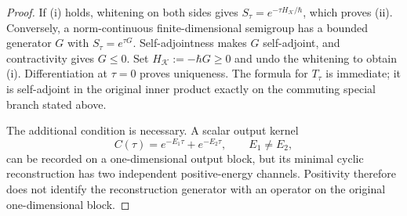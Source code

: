 \documentclass[12pt,a4paper]{article}
\begin{document}
\begin{proof}
If (i) holds, whitening on both sides gives
\(S_\tau=e^{-\tau H_{\mathcal K}/\hbar}\), which proves (ii).
Conversely, a norm-continuous finite-dimensional semigroup has a bounded
generator \(G\) with \(S_\tau=e^{\tau G}\).  Self-adjointness makes \(G\)
self-adjoint, and contractivity gives \(G\le0\).  Set
\(H_{\mathcal K}:=-\hbar G\ge0\) and undo the whitening to obtain (i).
Differentiation at \(\tau=0\) proves uniqueness.  The formula for \(T_\tau\)
is immediate; it is self-adjoint in the original inner product exactly on
the commuting special branch stated above.

The additional condition is necessary.  A scalar output kernel
\[
C(\tau)=e^{-E_1\tau}+e^{-E_2\tau},
\qquad E_1\ne E_2,
\]
can be recorded on a one-dimensional output block, but its minimal cyclic
reconstruction has two independent positive-energy channels.  Positivity
therefore does not identify the reconstruction generator with an operator
on the original one-dimensional block.
\end{proof}
\end{document}
